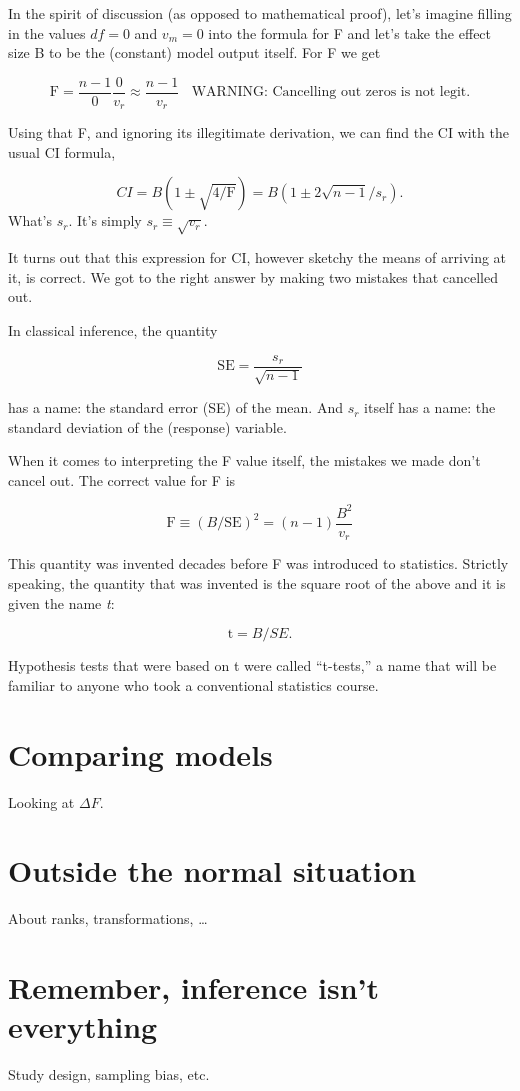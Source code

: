 \documentclass[]{book}
\begin{document}
In the spirit of discussion (as opposed to mathematical proof), let's imagine filling in the values \(df=0\) and \(v_m=0\) into the formula for F and let's take the effect size B to be the (constant) model output itself. For F we get

\[\mbox{F}  = \frac{n - 1}{0} \frac{0}{v_r} \approx \frac{n-1}{v_r}\ \ \ \ \mbox{WARNING: Cancelling out zeros is not legit.}\]

Using that F, and ignoring its illegitimate derivation, we can find the CI with the usual CI formula,

\[CI = B (1 \pm \sqrt{4/\mbox{F}}) = B (1 \pm 2 \sqrt{n-1} / s_r).\]
What's \(s_r\). It's simply \(s_r \equiv \sqrt{v_r}\).

It turns out that this expression for CI, however sketchy the means of arriving at it, is correct. We got to the right answer by making two mistakes that cancelled out.

In classical inference, the quantity

\[\mbox{SE} = \frac{s_r}{\sqrt{n-1}}\]

has a name: the standard error (SE) of the mean. And \(s_r\) itself has a name: the standard deviation of the (response) variable.

When it comes to interpreting the F value itself, the mistakes we made don't cancel out. The correct value for F is

\[\mbox{F} \equiv (B / \mbox{SE})^2 = (n-1) \frac{B^2}{v_r}\]

This quantity was invented decades before F was introduced to statistics. Strictly speaking, the quantity that was invented is the square root of the above and it is given the name \emph{t}:

\[\mbox{t}  = B / SE.\]

Hypothesis tests that were based on t were called ``t-tests,'' a name that will be familiar to anyone who took a conventional statistics course.

\hypertarget{comparing-models}{%
\chapter{Comparing models}\label{comparing-models}}

Looking at \(\Delta F\).

\hypertarget{outside-the-normal-situation}{%
\chapter{Outside the normal situation}\label{outside-the-normal-situation}}

About ranks, transformations, \ldots{}

\hypertarget{remember-inference-isnt-everything}{%
\chapter{Remember, inference isn't everything}\label{remember-inference-isnt-everything}}

Study design, sampling bias, etc.


\end{document}
